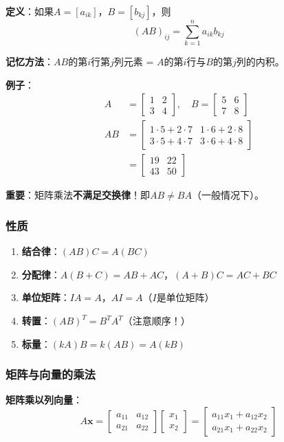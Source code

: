\documentclass[12pt,a4paper]{article}
\begin{document}
\textbf{定义}：如果$A = [a_{ik}]$，$B = [b_{kj}]$，则
\begin{equation}
(AB)_{ij} = \sum_{k=1}^n a_{ik} b_{kj}
\end{equation}

\textbf{记忆方法}：$AB$的第$i$行第$j$列元素 = $A$的第$i$行与$B$的第$j$列的内积。

\textbf{例子}：
\begin{align}
A &= \begin{bmatrix} 1 & 2 \\ 3 & 4 \end{bmatrix}, \quad
B = \begin{bmatrix} 5 & 6 \\ 7 & 8 \end{bmatrix} \\
AB &= \begin{bmatrix} 1 \cdot 5 + 2 \cdot 7 & 1 \cdot 6 + 2 \cdot 8 \\ 3 \cdot 5 + 4 \cdot 7 & 3 \cdot 6 + 4 \cdot 8 \end{bmatrix} \\
&= \begin{bmatrix} 19 & 22 \\ 43 & 50 \end{bmatrix}
\end{align}

\textbf{重要}：矩阵乘法\textbf{不满足交换律}！即$AB \neq BA$（一般情况下）。

\subsubsection{性质}

\begin{enumerate}
\item \textbf{结合律}：$(AB)C = A(BC)$
\item \textbf{分配律}：$A(B + C) = AB + AC$，$(A + B)C = AC + BC$
\item \textbf{单位矩阵}：$IA = A$，$AI = A$（$I$是单位矩阵）
\item \textbf{转置}：$(AB)^T = B^T A^T$（注意顺序！）
\item \textbf{标量}：$(kA)B = k(AB) = A(kB)$
\end{enumerate}

\subsubsection{矩阵与向量的乘法}

\textbf{矩阵乘以列向量}：
\begin{equation}
A \bm{x} = \begin{bmatrix} a_{11} & a_{12} \\ a_{21} & a_{22} \end{bmatrix} \begin{bmatrix} x_1 \\ x_2 \end{bmatrix} = \begin{bmatrix} a_{11}x_1 + a_{12}x_2 \\ a_{21}x_1 + a_{22}x_2 \end{bmatrix}
\end{equation}
\end{document}
